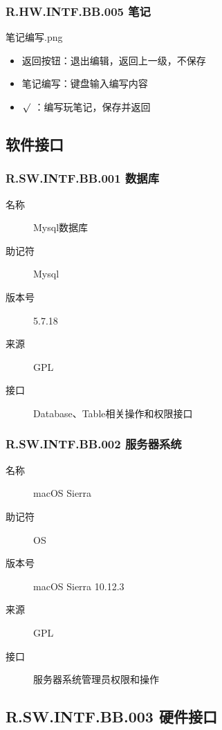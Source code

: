 \begin{enumerate}
    \subsubsection{R.HW.INTF.BB.005 笔记}
    笔记编写.png
    \begin{itemize}
  \item 返回按钮：退出编辑，返回上一级，不保存
  \item 笔记编写：键盘输入编写内容
  \item $\surd$ ：编写玩笔记，保存并返回
  \end{itemize}


  \subsection{软件接口}

    \subsubsection{R.SW.INTF.BB.001 数据库}
	\begin{center}\begin{description}
      \item[名称] Mysql数据库
      \item[助记符] Mysql
      \item[版本号]5.7.18
	\item[来源] GPL
	\item[接口] Database、Table相关操作和权限接口
	\end{description}\end{center}

    \subsubsection{R.SW.INTF.BB.002 服务器系统}
	\begin{center}\begin{description}
      \item[名称] macOS Sierra
      \item[助记符] OS
      \item[版本号] macOS Sierra 10.12.3
	\item[来源] GPL
	\item[接口] 服务器系统管理员权限和操作
	\end{description}\end{center}

  \subsection{R.SW.INTF.BB.003 硬件接口}

\end{enumerate}
